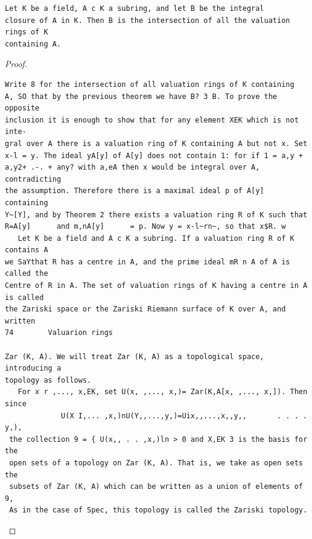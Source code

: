 \begin{theorem}\label{mcrt-auto-theorem-10-4}\uses{}
\begin{verbatim}
Let K be a field, A c K a subring, and let B be the integral
closure of A in K. Then B is the intersection of all the valuation rings of K
containing A.
\end{verbatim}
\end{theorem}
\begin{proof}
\begin{verbatim}
Write 8 for the intersection of all valuation rings of K containing
A, SO that by the previous theorem we have B? 3 B. To prove the opposite
inclusion it is enough to show that for any element XEK which is not inte-
gral over A there is a valuation ring of K containing A but not x. Set
x-l = y. The ideal yA[y] of A[y] does not contain 1: for if 1 = a,y +
a,y2+ .-. + any? with a,eA then x would be integral over A, contradicting
the assumption. Therefore there is a maximal ideal p of A[y] containing
Y~[Y], and by Theorem 2 there exists a valuation ring R of K such that
R=A[y]      and m,nA[y]      = p. Now y = x-l~rn~, so that x$R. w
   Let K be a field and A c K a subring. If a valuation ring R of K contains A
we SaYthat R has a centre in A, and the prime ideal mR n A of A is called the
Centre of R in A. The set of valuation rings of K having a centre in A is called
the Zariski space or the Zariski Riemann surface of K over A, and written
74        Valuarion rings

Zar (K, A). We will treat Zar (K, A) as a topological space, introducing a
topology as follows.
   For x r ,..., x,EK, set U(x, ,..., x,)= Zar(K,A[x, ,..., x,]). Then since
             U(X I,... ,x,)nU(Y,,...,y,)=Uix,,...,x,,y,,       . . . . y,),
 the collection 9 = { U(x,, . . ,x,)ln > 0 and X,EK 3 is the basis for the
 open sets of a topology on Zar (K, A). That is, we take as open sets the
 subsets of Zar (K, A) which can be written as a union of elements of 9,
 As in the case of Spec, this topology is called the Zariski topology.
\end{verbatim}
\end{proof}


